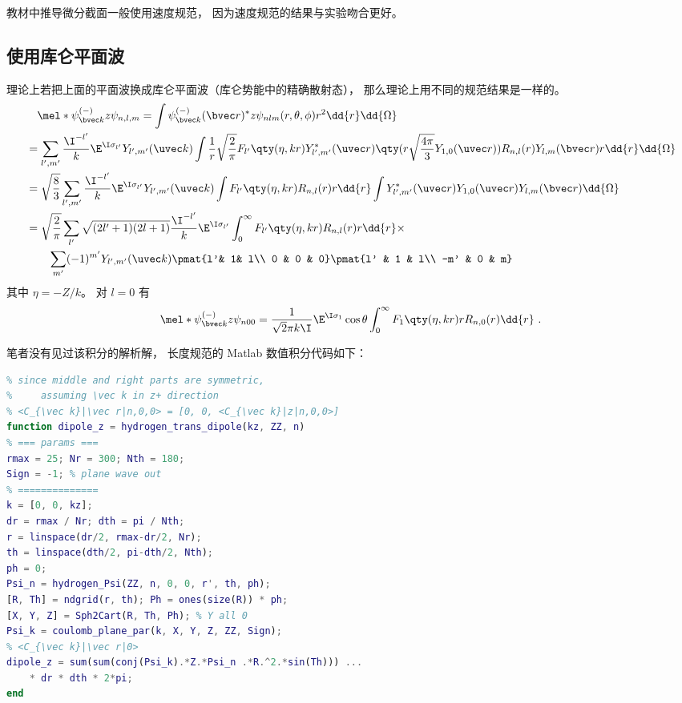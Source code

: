 教材中推导微分截面一般使用速度规范， 因为速度规范的结果与实验吻合更好。

\subsection{使用库仑平面波}

理论上若把上面的平面波换成库仑平面波（库仑势能中的精确散射态）， 那么理论上用不同的规范结果是一样的。
\begin{equation}
\begin{aligned}
&\quad\mel*{\psi_{\bvec k}^{(-)}}{z}{\psi_{n,l,m}} = \int \psi_{\bvec k}^{(-)}(\bvec r)^* z \psi_{nlm}(r,\theta,\phi) r^2 \dd{r}\dd{\Omega}\\
&= \sum_{l',m'} \frac{\I^{-l'}}{k} \E^{\I\sigma_{l'}} Y_{l',m'}(\uvec k) \int \frac{1}{r} \sqrt{\frac{2}{\pi}} F_{l'}\qty(\eta, kr) Y_{l',m'}^*(\uvec r) \qty(r \sqrt{\frac{4\pi}{3}} Y_{1,0}(\uvec r))R_{n,l}(r) Y_{l,m}(\bvec r) r \dd{r}\dd{\Omega}\\
&= \sqrt{\frac{8}{3}}\sum_{l',m'} \frac{\I^{-l'}}{k} \E^{\I\sigma_{l'}} Y_{l',m'}(\uvec k) \int F_{l'}\qty(\eta, kr) R_{n,l}(r) r \dd{r} \int Y_{l',m'}^*(\uvec r)Y_{1,0}(\uvec r)Y_{l,m}(\bvec r) \dd{\Omega}\\
&= \sqrt{\frac{2}{\pi}} \sum_{l'} \sqrt{(2l'+1)(2l+1)} \frac{\I^{-l'}}{k} \E^{\I\sigma_{l'}} \int_0^\infty F_{l'}\qty(\eta, kr) R_{n,l}(r) r\dd{r}\times\\
& \qquad \sum_{m'}  (-1)^{m'} Y_{l',m'}(\uvec k) \pmat{l'& 1& l\\ 0 & 0 & 0}\pmat{l' & 1 & l\\  -m' & 0 & m}
\end{aligned}
\end{equation}
其中 $\eta = -Z/k$。 对 $l=0$ 有
\begin{equation}
\mel*{\psi_{\bvec k}^{(-)}}{z}{\psi_{n00}} = \frac{1}{\sqrt{2}\pi k\I} \E^{\I\sigma_1} \cos\theta \int_0^\infty F_1\qty(\eta, kr) rR_{n,0}(r) \dd{r}~.
\end{equation}


笔者没有见过该积分的解析解， 长度规范的 Matlab 数值积分代码如下：

\begin{lstlisting}[language=matlab, caption=hydrogen\_trans\_dipole.m]
% exact hydrogen transition dipole with Coulomb plane wave
% since middle and right parts are symmetric,
%     assuming \vec k in z+ direction
% <C_{\vec k}|\vec r|n,0,0> = [0, 0, <C_{\vec k}|z|n,0,0>]
function dipole_z = hydrogen_trans_dipole(kz, ZZ, n)
% === params ===
rmax = 25; Nr = 300; Nth = 180;
Sign = -1; % plane wave out
% ==============
k = [0, 0, kz];
dr = rmax / Nr; dth = pi / Nth;
r = linspace(dr/2, rmax-dr/2, Nr);
th = linspace(dth/2, pi-dth/2, Nth); 
ph = 0;
Psi_n = hydrogen_Psi(ZZ, n, 0, 0, r', th, ph);
[R, Th] = ndgrid(r, th); Ph = ones(size(R)) * ph;
[X, Y, Z] = Sph2Cart(R, Th, Ph); % Y all 0
Psi_k = coulomb_plane_par(k, X, Y, Z, ZZ, Sign);
% <C_{\vec k}|\vec r|0>
dipole_z = sum(sum(conj(Psi_k).*Z.*Psi_n .*R.^2.*sin(Th))) ...
    * dr * dth * 2*pi;
end
\end{lstlisting}

